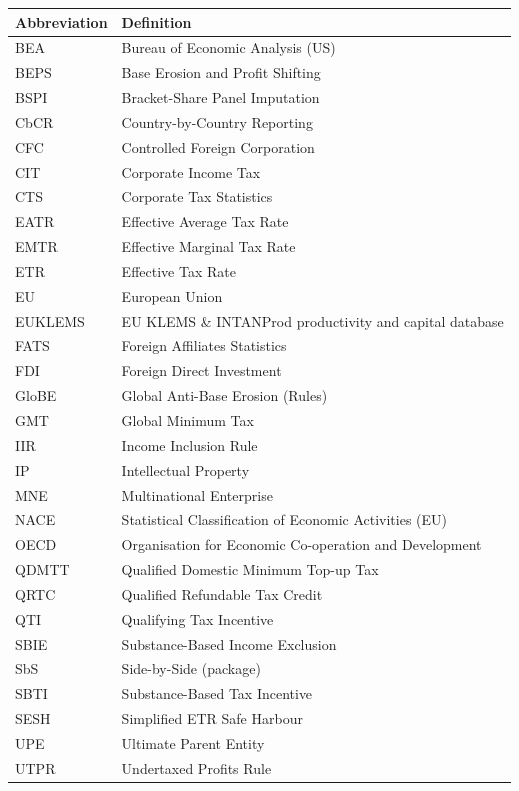 \documentclass[11pt,a4paper]{article}
\begin{document}
{\small
\begin{tabular}{@{}ll@{}}
  \toprule
  \textbf{Abbreviation} & \textbf{Definition} \\
  \midrule
  BEA & Bureau of Economic Analysis (US) \\
  BEPS & Base Erosion and Profit Shifting \\
  BSPI & Bracket-Share Panel Imputation \\
  CbCR & Country-by-Country Reporting \\
  CFC & Controlled Foreign Corporation \\
  CIT & Corporate Income Tax \\
  CTS & Corporate Tax Statistics \\
  EATR & Effective Average Tax Rate \\
  EMTR & Effective Marginal Tax Rate \\
  ETR & Effective Tax Rate \\
  EU & European Union \\
  EUKLEMS & EU KLEMS \& INTANProd productivity and capital database \\
  FATS & Foreign Affiliates Statistics \\
  FDI & Foreign Direct Investment \\
  GloBE & Global Anti-Base Erosion (Rules) \\
  GMT & Global Minimum Tax \\
  IIR & Income Inclusion Rule \\
  IP & Intellectual Property \\
  MNE & Multinational Enterprise \\
  NACE & Statistical Classification of Economic Activities (EU) \\
  OECD & Organisation for Economic Co-operation and Development \\
  QDMTT & Qualified Domestic Minimum Top-up Tax \\
  QRTC & Qualified Refundable Tax Credit \\
  QTI & Qualifying Tax Incentive \\
  SBIE & Substance-Based Income Exclusion \\
  SbS & Side-by-Side (package) \\
  SBTI & Substance-Based Tax Incentive \\
  SESH & Simplified ETR Safe Harbour \\
  UPE & Ultimate Parent Entity \\
  UTPR & Undertaxed Profits Rule \\
  \bottomrule
\end{tabular}
}
\end{document}
